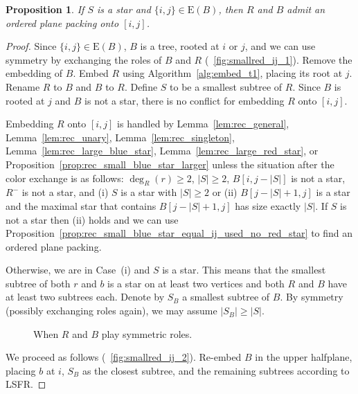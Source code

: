 \documentclass[11pt,a4paper,colorlinks=true,urlcolor=blue,citecolor=red]{article}
\theoremstyle{plain}
\newtheorem{proposition}[theorem]{Proposition}
\newcommand{\EB}{\mathrm{E}(B)}
\begin{document}
\begin{proposition}\label{prop:rec_small_red_star_ij_used}
  If $S$ is a star and $\{i,j\}\in\EB$, then $R$ and $B$ admit
  an ordered plane packing onto $[i,j]$.
\end{proposition}
\begin{proof}
  Since $\{i,j\}\in\EB$, $B$ is a tree, rooted at $i$ or $j$,
  and we can use symmetry by exchanging the roles of $B$ and $R$
  (\figurename~\ref{fig:smallred_ij_1}). Remove the embedding of $B$.
  Embed $R$ using Algorithm~\ref{alg:embed_t1}, placing its root at $j$.
  Rename $R$ to $B$ and $B$ to $R$. Define $S$ to be a smallest subtree
  of $R$. Since $B$ is rooted at $j$ and $B$ is not a star, there is no
  conflict for embedding $R$ onto $[i,j]$.

  Embedding $R$ onto $[i,j]$ is handled by Lemma~\ref{lem:rec_general},
  Lemma~\ref{lem:rec_unary}, Lemma~\ref{lem:rec_singleton},
  Lemma~\ref{lem:rec_large_blue_star},
  Lemma~\ref{lem:rec_large_red_star}, or
  Proposition~\ref{prop:rec_small_blue_star_larger} unless the situation
  after the color exchange is as follows: $\deg_R(r)\ge 2$, $|S|\geq2$,
  $B[i,j-|S|]$ is not a star, $R^-$ is not a star, and (i) $S$ is a star
  with $|S|\geq 2$ or (ii) $B[j-|S|+1,j]$ is a star and the maximal star
  that contains $B[j-|S|+1,j]$ has size exactly $|S|$. If $S$ is not a
  star then (ii) holds and we can use
  Proposition~\ref{prop:rec_small_blue_star_equal_ij_used_no_red_star}
  to find an ordered plane packing.

  Otherwise, we are in Case~(i) and $S$ is a star. This means that the
  smallest subtree of both $r$ and $b$ is a star on at least two
  vertices and both $R$ and $B$ have at least two subtrees each. Denote
  by $S_B$ a smallest subtree of $B$. By symmetry (possibly exchanging
  roles again), we may assume $|S_B|\ge|S|$.

  \begin{figure}[htbp]
    \centering\hfil {}\hfil {}\hfil \caption{When $R$ and $B$ play symmetric
      roles.\label{fig:smallred_ij}}
  \end{figure}

  We proceed as follows (\figurename~\ref{fig:smallred_ij_2}). Re-embed
  $B$ in the upper halfplane, placing $b$ at $i$, $S_B$ as the closest
  subtree, and the remaining subtrees according to LSFR.


\end{proof}
\end{document}
